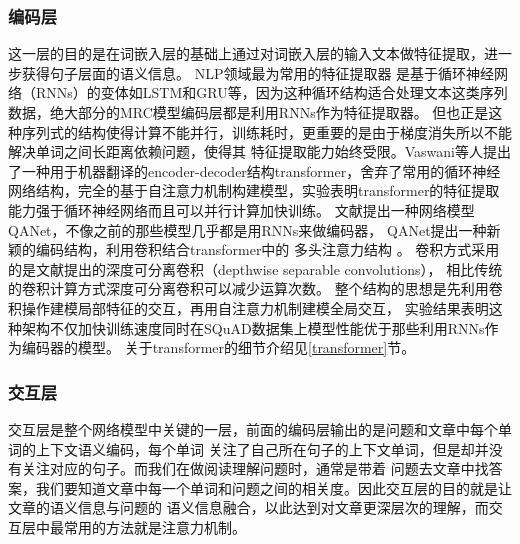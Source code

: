 \subsubsection{编码层}
这一层的目的是在词嵌入层的基础上通过对词嵌入层的输入文本做特征提取，进一步获得句子层面的语义信息。
NLP领域最为常用的特征提取器
是基于循环神经网络（RNNs）的变体如LSTM和GRU等，因为这种循环结构适合处理文本这类序列数据，绝大部分的MRC模型编码层都是利用RNNs作为特征提取器。
但也正是这种序列式的结构使得计算不能并行，训练耗时，更重要的是由于梯度消失所以不能解决单词之间长距离依赖问题，使得其
特征提取能力始终受限。Vaswani等人提出了一种用于机器翻译的encoder-decoder结构transformer，舍弃了常用的循环神经网络结构，完全的基于自注意力机制构建模型，实验表明transformer的特征提取能力强于循环神经网络而且可以并行计算加快训练。
文献\cite{QANet}提出一种网络模型QANet，不像之前的那些模型几乎都是用RNNs来做编码器，
QANet提出一种新颖的编码结构，利用卷积结合transformer中的
多头注意力结构
。
卷积方式采用的是文献\cite{DSC}提出的深度可分离卷积（depthwise 
separable convolutions），
相比传统的卷积计算方式深度可分离卷积可以减少运算次数。
整个结构的思想是先利用卷积操作建模局部特征的交互，再用自注意力机制建模全局交互，
实验结果表明这种架构不仅加快训练速度同时在SQuAD数据集上模型性能优于那些利用RNNs作为编码器的模型。
关于transformer的细节介绍见\ref{transformer}节。



\subsubsection{交互层}
交互层是整个网络模型中关键的一层，前面的编码层输出的是问题和文章中每个单词的上下文语义编码，每个单词
关注了自己所在句子的上下文单词，但是却并没有关注对应的句子。而我们在做阅读理解问题时，通常是带着
问题去文章中找答案，我们要知道文章中每一个单词和问题之间的相关度。因此交互层的目的就是让文章的语义信息与问题的
语义信息融合，以此达到对文章更深层次的理解，而交互层中最常用的方法就是注意力机制。


